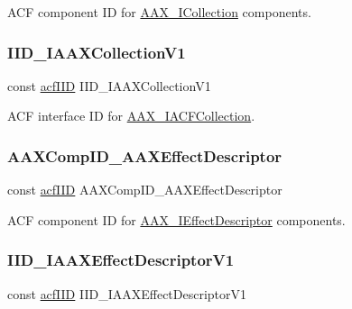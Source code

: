 A\+CF component ID for \mbox{\hyperlink{a01777}{A\+A\+X\+\_\+\+I\+Collection}} components. 

\mbox{\label{a00683_a2dbdb6a2a17831779b25bd74116ed836}} 
\subsubsection{\texorpdfstring{IID\_IAAXCollectionV1}{IID\_IAAXCollectionV1}}
{\footnotesize\ttfamily const \mbox{\hyperlink{a00269_a59df0b41744eee7a066787aaedf97f67}{acf\+I\+ID}} I\+I\+D\+\_\+\+I\+A\+A\+X\+Collection\+V1}



A\+CF interface ID for \mbox{\hyperlink{a01621}{A\+A\+X\+\_\+\+I\+A\+C\+F\+Collection}}. 

\mbox{\label{a00683_afd8738bffaa66c1178a0ca1172861773}} 
\subsubsection{\texorpdfstring{AAXCompID\_AAXEffectDescriptor}{AAXCompID\_AAXEffectDescriptor}}
{\footnotesize\ttfamily const \mbox{\hyperlink{a00269_a59df0b41744eee7a066787aaedf97f67}{acf\+I\+ID}} A\+A\+X\+Comp\+I\+D\+\_\+\+A\+A\+X\+Effect\+Descriptor}



A\+CF component ID for \mbox{\hyperlink{a01813}{A\+A\+X\+\_\+\+I\+Effect\+Descriptor}} components. 

\mbox{\label{a00683_a009151e7f4d79356c7e2da2b2094e5e4}} 
\subsubsection{\texorpdfstring{IID\_IAAXEffectDescriptorV1}{IID\_IAAXEffectDescriptorV1}}
{\footnotesize\ttfamily const \mbox{\hyperlink{a00269_a59df0b41744eee7a066787aaedf97f67}{acf\+I\+ID}} I\+I\+D\+\_\+\+I\+A\+A\+X\+Effect\+Descriptor\+V1}



